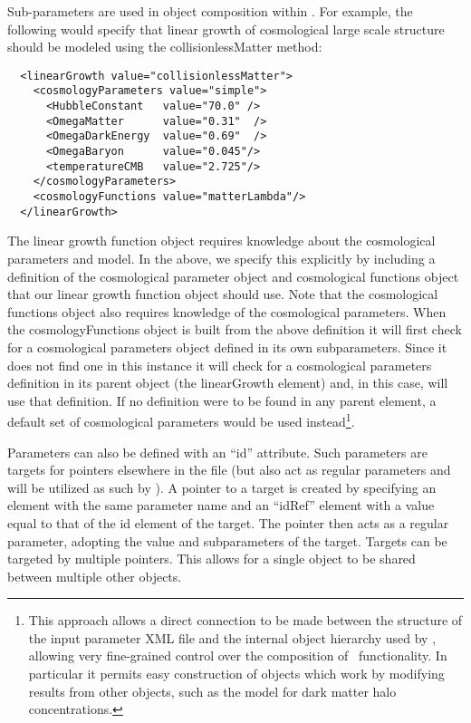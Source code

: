 Sub-parameters are used in object composition within \glc. For example, the following would specify that linear growth of cosmological large scale structure should be modeled using the {\normalfont \ttfamily collisionlessMatter} method:
\begin{verbatim}
  <linearGrowth value="collisionlessMatter">
    <cosmologyParameters value="simple">
      <HubbleConstant   value="70.0" />
      <OmegaMatter      value="0.31"  />
      <OmegaDarkEnergy  value="0.69"  />
      <OmegaBaryon      value="0.045"/>
      <temperatureCMB   value="2.725"/>
    </cosmologyParameters>
    <cosmologyFunctions value="matterLambda"/>
  </linearGrowth>
\end{verbatim}
The linear growth function object requires knowledge about the cosmological parameters and model. In the above, we specify this explicitly by including a definition of the cosmological parameter object and cosmological functions object that our linear growth function object should use. Note that the cosmological functions object also requires knowledge of the cosmological parameters. When the {\normalfont \ttfamily cosmologyFunctions} object is built from the above definition it will first check for a cosmological parameters object defined in its own subparameters. Since it does not find one in this instance it will check for a cosmological parameters definition in its parent object (the {\normalfont \ttfamily linearGrowth} element) and, in this case, will use that definition. If no definition were to be found in any parent element, a default set of cosmological parameters would be used instead\footnote{This approach allows a direct connection to be made between the structure of the input parameter XML file and the internal object hierarchy used by \glc, allowing very fine-grained control over the composition of \glc\ functionality. In particular it permits easy construction of objects which work by modifying results from other objects, such as the \protect{} model for dark matter halo concentrations.}.

Parameters can also be defined with an ``{\normalfont \ttfamily id}'' attribute. Such parameters are targets for pointers elsewhere in the file (but also act as regular parameters and will be utilized as such by \glc). A pointer to a target is created by specifying an element with the same parameter name and an ``{\normalfont \ttfamily idRef}'' element with a value equal to that of the {\normalfont \ttfamily id} element of the target. The pointer then acts as a regular parameter, adopting the value and subparameters of the target. Targets can be targeted by multiple pointers. This allows for a single object to be shared between multiple other objects.

